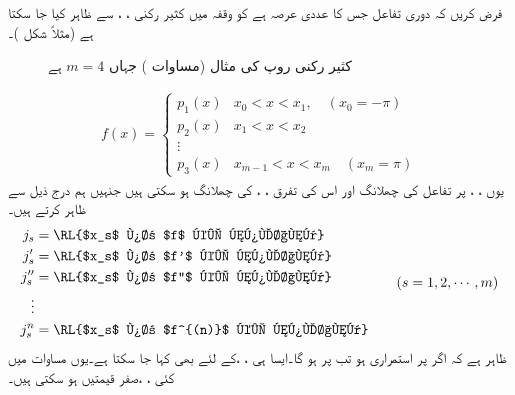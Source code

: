 فرض کریں کہ دوری تفاعل  جس کا عددی عرصہ  ہے کو وقفہ  میں کثیر رکنی ، ،  سے ظاہر کیا جا سکتا ہے (مثلاً شکل )۔
\begin{figure}
\centering
{}
\caption{کثیر رکنی روپ کی مثال (مساوات ) جہاں $m=4$ ہے}
\label{شکل_فوریئر_کثیر_رکنی_روپ}
\end{figure}
%
\begin{align}\label{مساوات_فوریئر_کثیر_رکنی_روپ_الف}
f(x)=
\begin{cases}
p_1(x)&x_0<x<x_1,\quad (x_0=-\pi)\\
p_2(x)& x_1<x<x_2\\
\vdots&\\
p_3(x)& x_{m-1}<x<x_m \quad (x_m=\pi)
\end{cases}
\end{align}
یوں ، ،  پر تفاعل  کی چھلانگ اور اس کی تفرق ، ،   کی چھلانگ ہو سکتی ہیں جنہیں ہم درج ذیل سے ظاہر کرتے ہیں۔
\begin{gather}
\begin{aligned}\label{مساوات_فوریئر_چھلانگ_الف}
j_s&=\text{\RL{$x_s$ پر $f$ کی چھلانگ}}\\
j'_s&=\text{\RL{$x_s$ پر $f'$ کی چھلانگ}}\\
j''_s&=\text{\RL{$x_s$ پر $f''$ کی چھلانگ}}\\
\vdots\\
j^{n}_s&=\text{\RL{$x_s$ پر $f^{(n)}$ کی چھلانگ}}\\
\end{aligned}
\quad \quad (s=1,2,\cdots,m)
\end{gather}
ظاہر ہے کہ اگر  پر  استمراری ہو تب  پر  ہو گا۔ایسا ہی ، ،  کے لئے بھی کہا جا سکتا ہے۔یوں مساوات  میں کئی ، ، صفر قیمتیں ہو سکتی ہیں۔

